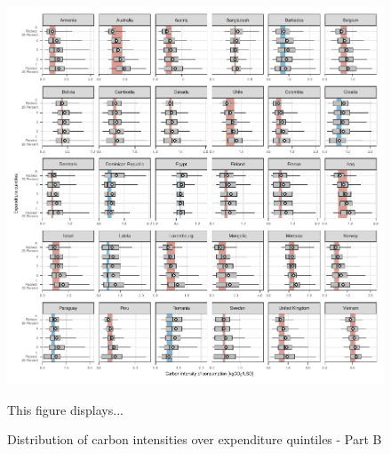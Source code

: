 \documentclass[12pt, a4paper]{article}
\newenvironment{subcaption}
{\strut
\vspace{-5pt}
\begin{minipage}[b]{0.9\textwidth}
  \hspace*{-\parindent}
  \footnotesize}
 {\end{minipage}}
\begin{document}
\begin{figure}[ht!]
  \centering
  \caption{Distribution of carbon intensities over expenditure quintiles - Part B} \label{fig:Quint_B}
  \includegraphics{1_Figures/Figures_Appendix/Figure_1_2017_Appendix_2}
  \begin{subcaption}
    This figure displays...
  \end{subcaption}

\end{figure}

\clearpage
\end{document}
